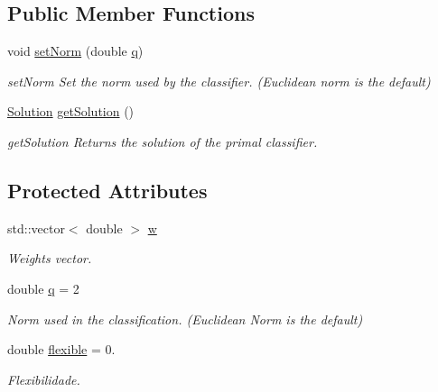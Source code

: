 \subsection*{Public Member Functions}
\begin{DoxyCompactItemize}
\item 
void \hyperlink{class_primal_classifier_aecd2369094119c294333bc12df419b16}{set\+Norm} (double \hyperlink{class_primal_classifier_a746ad2ff93fb77d82ae389f90dbdc89e}{q})
\begin{DoxyCompactList}\small\item\em set\+Norm Set the norm used by the classifier. (Euclidean norm is the default) \end{DoxyCompactList}\item 
\hyperlink{class_solution}{Solution} \hyperlink{class_primal_classifier_a1a3d9ba4e80c58418db0d8454168b910}{get\+Solution} ()
\begin{DoxyCompactList}\small\item\em get\+Solution Returns the solution of the primal classifier. \end{DoxyCompactList}\end{DoxyCompactItemize}
\subsection*{Protected Attributes}
\begin{DoxyCompactItemize}
\item 
\mbox{\label{class_primal_classifier_ad6ad165a5ad305841797374de9fc2aac}} 
std\+::vector$<$ double $>$ \hyperlink{class_primal_classifier_ad6ad165a5ad305841797374de9fc2aac}{w}
\begin{DoxyCompactList}\small\item\em Weights vector. \end{DoxyCompactList}\item 
\mbox{\label{class_primal_classifier_a746ad2ff93fb77d82ae389f90dbdc89e}} 
double \hyperlink{class_primal_classifier_a746ad2ff93fb77d82ae389f90dbdc89e}{q} = 2
\begin{DoxyCompactList}\small\item\em Norm used in the classification. (Euclidean Norm is the default) \end{DoxyCompactList}\item 
\mbox{\label{class_primal_classifier_af660bbc42f67792e3da8876671b1e9df}} 
double \hyperlink{class_primal_classifier_af660bbc42f67792e3da8876671b1e9df}{flexible} = 0.
\begin{DoxyCompactList}\small\item\em Flexibilidade. \end{DoxyCompactList}\end{DoxyCompactItemize}


